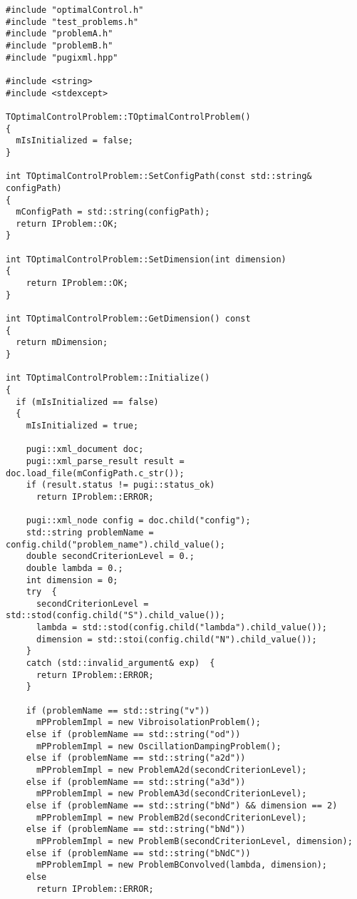 \begin{lstlisting}[frame=single]
#include "optimalControl.h"
#include "test_problems.h"
#include "problemA.h"
#include "problemB.h"
#include "pugixml.hpp"

#include <string>
#include <stdexcept>

TOptimalControlProblem::TOptimalControlProblem()
{
  mIsInitialized = false;
}

int TOptimalControlProblem::SetConfigPath(const std::string& configPath)
{
  mConfigPath = std::string(configPath);
  return IProblem::OK;
}

int TOptimalControlProblem::SetDimension(int dimension)
{
    return IProblem::OK;
}

int TOptimalControlProblem::GetDimension() const
{
  return mDimension;
}

int TOptimalControlProblem::Initialize()
{
  if (mIsInitialized == false)
  {
    mIsInitialized = true;

    pugi::xml_document doc;
    pugi::xml_parse_result result = doc.load_file(mConfigPath.c_str());
    if (result.status != pugi::status_ok)
      return IProblem::ERROR;

    pugi::xml_node config = doc.child("config");
    std::string problemName = config.child("problem_name").child_value();
    double secondCriterionLevel = 0.;
    double lambda = 0.;
    int dimension = 0;
    try  {
      secondCriterionLevel = std::stod(config.child("S").child_value());
      lambda = std::stod(config.child("lambda").child_value());
      dimension = std::stoi(config.child("N").child_value());
    }
    catch (std::invalid_argument& exp)  {
      return IProblem::ERROR;
    }

    if (problemName == std::string("v"))
      mPProblemImpl = new VibroisolationProblem();
    else if (problemName == std::string("od"))
      mPProblemImpl = new OscillationDampingProblem();
    else if (problemName == std::string("a2d"))
      mPProblemImpl = new ProblemA2d(secondCriterionLevel);
    else if (problemName == std::string("a3d"))
      mPProblemImpl = new ProblemA3d(secondCriterionLevel);
    else if (problemName == std::string("bNd") && dimension == 2)
      mPProblemImpl = new ProblemB2d(secondCriterionLevel);
    else if (problemName == std::string("bNd"))
      mPProblemImpl = new ProblemB(secondCriterionLevel, dimension);
    else if (problemName == std::string("bNdC"))
      mPProblemImpl = new ProblemBConvolved(lambda, dimension);
    else
      return IProblem::ERROR;


\end{lstlisting}
